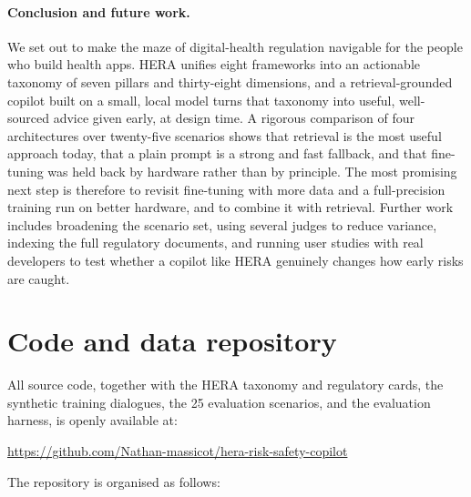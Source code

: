 \documentclass[11pt]{article}
\begin{document}
\paragraph{Conclusion and future work.}
We set out to make the maze of digital-health regulation navigable for the people who
build health apps. HERA unifies eight frameworks into an actionable taxonomy of seven
pillars and thirty-eight dimensions, and a retrieval-grounded copilot built on a small,
local model turns that taxonomy into useful, well-sourced advice given early, at design
time. A rigorous comparison of four architectures over twenty-five scenarios shows that
retrieval is the most useful approach today, that a plain prompt is a strong and fast
fallback, and that fine-tuning was held back by hardware rather than by principle. The most
promising next step is therefore to revisit fine-tuning with more data and a full-precision
training run on better hardware, and to combine it with retrieval. Further work includes
broadening the scenario set, using several judges to reduce variance, indexing the full
regulatory documents, and running user studies with real developers to test whether a
copilot like HERA genuinely changes how early risks are caught.



\appendix

\section{Code and data repository}
\label{app:repo}

All source code, together with the HERA taxonomy and regulatory cards, the
synthetic training dialogues, the 25 evaluation scenarios, and the evaluation
harness, is openly available at:

\begin{center}
\url{https://github.com/Nathan-massicot/hera-risk-safety-copilot}
\end{center}

\noindent The repository is organised as follows:
\end{document}
